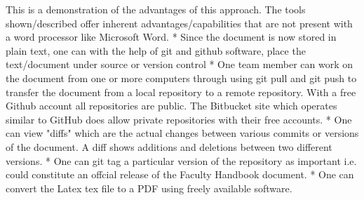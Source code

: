 This is a demonstration of the advantages of this approach. The tools shown/described offer inherent advantages/capabilities that are not present with a word processor like Microsoft Word.
* Since the document is now stored in plain text, one can with the help of git and github software, place the text/document under source or version control
* One team member can work on the document from one or more computers through using git pull and git push to transfer the document from a local repository to a remote repository. With a free Github account all repositories are public. The Bitbucket site which operates similar to GitHub does allow private repositories with their free accounts.
* One can view "diffs" which are the actual changes between various commits or versions of the document. A diff shows additions and deletions between two different versions.
* One can git tag a particular version of the repository as important i.e. could constitute an offcial release of the Faculty Handbook document.
* One can convert the Latex tex file to a PDF using freely available software.
